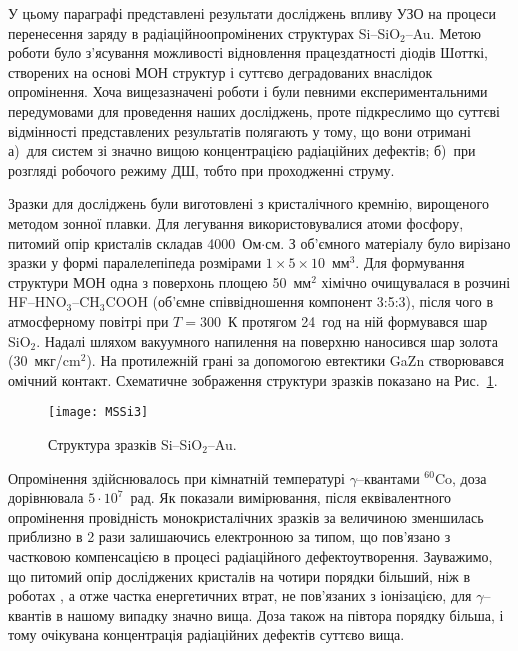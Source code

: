 У цьому параграфі представлені результати досліджень впливу УЗО на процеси перенесення заряду в радіаційноопромінених структурах Si--SiO$_2$--Au.
Метою роботи було з'ясування можливості відновлення працездатності діодів Шотткі, створених на основі МОН структур і суттєво деградованих внаслідок опромінення.
Хоча вищезазначені роботи \cite{Parchinskii2000r,Parchinskii2006r} і були певними експериментальними передумовами для проведення наших досліджень, проте
підкреслимо що суттєві відмінності представлених результатів полягають у тому, що вони отримані
а)~для систем зі значно вищою концентрацією радіаційних дефектів;
б)~при розгляді робочого режиму ДШ, тобто при проходженні струму.



Зразки для досліджень були виготовлені з кристалічного кремнію, вирощеного методом зонної плавки.
Для легування використовувалися атоми фосфору, питомий опір кристалів складав 4000~Ом$\cdot$см.
З об'ємного матеріалу було вирізано зразки у формі паралелепіпеда розмірами $1\times5\times10$~мм$^3$.
Для формування структури МОН одна з поверхонь площею 50~мм$^2$ хімічно очищувалася в розчині HF--HNO$_3$--CH$_3$COOH (об'ємне співвідношення компонент 3:5:3),
після чого в атмосферному повітрі при $T=300$~К протягом 24~год на ній формувався шар SiO$_2$.
Надалі шляхом вакуумного напилення на поверхню наносився шар золота (30~мкг/cm$^2$).
На протилежній грані за допомогою евтектики GaZn створювався омічний контакт.
Схематичне зображення структури зразків показано на Рис.~\ref{figMSSi3}.

\begin{figure}[b]
\center
\texttt{[image: MSSi3]}%
\caption{\label{figMSSi3}
Структура зразків Si--SiO$_2$--Au.
}
\end{figure}

Опромінення здійснювалось при кімнатній температурі $\gamma$--квантами $^{60}$Co, доза дорівнювала $5\cdot10^7$~рад.
Як показали вимірювання, після еквівалентного опромінення провідність монокристалічних зразків за величиною зменшилась приблизно в 2 рази залишаючись електронною за типом,
що пов'язано з частковою компенсацією в процесі радіаційного дефектоутворення.
Зауважимо, що питомий опір досліджених кристалів на чотири порядки більший, ніж в роботах \cite{Parchinskii2000r,Parchinskii2006r}, а отже частка енергетичних втрат, не пов'язаних з іонізацією, для $\gamma$--квантів в нашому випадку значно вища.
Доза також на півтора порядку більша, і тому очікувана концентрація радіаційних дефектів суттєво вища.


